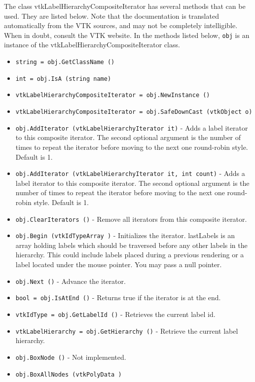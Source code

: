 The class vtkLabelHierarchyCompositeIterator has several methods that can be used.
  They are listed below.
Note that the documentation is translated automatically from the VTK sources,
and may not be completely intelligible.  When in doubt, consult the VTK website.
In the methods listed below, \verb|obj| is an instance of the vtkLabelHierarchyCompositeIterator class.
\begin{itemize}
\item  \verb|string = obj.GetClassName ()|

\item  \verb|int = obj.IsA (string name)|

\item  \verb|vtkLabelHierarchyCompositeIterator = obj.NewInstance ()|

\item  \verb|vtkLabelHierarchyCompositeIterator = obj.SafeDownCast (vtkObject o)|

\item  \verb|obj.AddIterator (vtkLabelHierarchyIterator it)| -  Adds a label iterator to this composite iterator.
 The second optional argument is the number of times to repeat the iterator
 before moving to the next one round-robin style. Default is 1.

\item  \verb|obj.AddIterator (vtkLabelHierarchyIterator it, int count)| -  Adds a label iterator to this composite iterator.
 The second optional argument is the number of times to repeat the iterator
 before moving to the next one round-robin style. Default is 1.

\item  \verb|obj.ClearIterators ()| -  Remove all iterators from this composite iterator.

\item  \verb|obj.Begin (vtkIdTypeArray )| -  Initializes the iterator. lastLabels is an array holding labels
 which should be traversed before any other labels in the hierarchy.
 This could include labels placed during a previous rendering or
 a label located under the mouse pointer. You may pass a null pointer.

\item  \verb|obj.Next ()| -  Advance the iterator.

\item  \verb|bool = obj.IsAtEnd ()| -  Returns true if the iterator is at the end.

\item  \verb|vtkIdType = obj.GetLabelId ()| -  Retrieves the current label id.

\item  \verb|vtkLabelHierarchy = obj.GetHierarchy ()| -  Retrieve the current label hierarchy.

\item  \verb|obj.BoxNode ()| -  Not implemented.

\item  \verb|obj.BoxAllNodes (vtkPolyData )|

\end{itemize}
